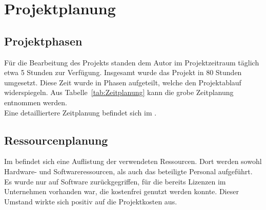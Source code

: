 \section{Projektplanung} 
\label{sec:Projektplanung}

\subsection{Projektphasen}
\label{sec:Projektphasen}
Für die Bearbeitung des Projekts standen dem Autor im Projektzeitraum täglich etwa 5 Stunden zur Verfügung.
Insgesamt wurde das Projekt in 80 Stunden umgesetzt. Diese Zeit wurde in Phasen aufgeteilt, welche den
Projektablauf widerspiegeln. Aus Tabelle~\ref{tab:Zeitplanung} kann die grobe Zeitplanung entnommen werden.
\\
Eine detailliertere Zeitplanung befindet sich im .


\subsection{Ressourcenplanung}
\label{sec:Ressourcenplanung}
Im  befindet sich eine Auflistung der verwendeten Ressourcen.
Dort werden sowohl Hardware- und Softwareressourcen, als auch das beteiligte Personal aufgeführt.
Es wurde nur auf Software zurückgegriffen, für die bereits Lizenzen im Unternehmen vorhanden war,
\bzw die kostenfrei genutzt werden konnte. Dieser Umstand wirkte sich positiv auf die Projektkosten aus.

